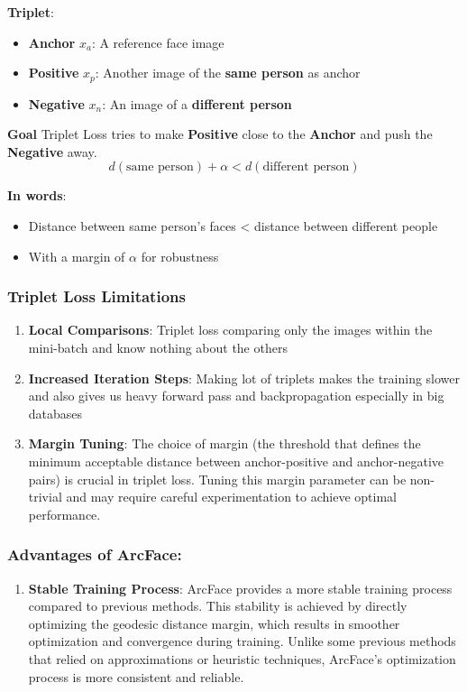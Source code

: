 \documentclass[sommairechap,stylejchiquet]{these_gi}
\begin{document}
\textbf{Triplet}:
\begin{itemize}
    \item \textbf{Anchor} $x_a$: A reference face image
    \item \textbf{Positive} $x_p$: Another image of the \textbf{same person} as anchor
    \item \textbf{Negative} $x_n$: An image of a \textbf{different person}
\end{itemize}

\textbf{Goal}
Triplet Loss tries to make \textbf{Positive} close to the \textbf{Anchor} and push the \textbf{Negative} away.
\begin{equation}
d(\text{same person}) + \alpha < d(\text{different person})
\end{equation}

\textbf{In words}:
\begin{itemize}
    \item Distance between same person's faces < distance between different people
    \item With a margin of $\alpha$ for robustness
\end{itemize}

\subsubsection{Triplet Loss Limitations}
\begin{enumerate}
    \item \textbf{Local Comparisons}: Triplet loss comparing only the images within the mini-batch and know nothing about the others
    \item \textbf{Increased Iteration Steps}: Making lot of triplets makes the training slower and also gives us heavy forward pass and backpropagation especially in big databases
    \item \textbf{Margin Tuning}: The choice of margin (the threshold that defines the minimum acceptable distance between anchor-positive and anchor-negative pairs) is crucial in triplet loss. Tuning this margin parameter can be non-trivial and may require careful experimentation to achieve optimal performance.
\end{enumerate}

\subsubsection{Advantages of ArcFace:}
\begin{enumerate}
    \item \textbf{Stable Training Process}: ArcFace provides a more stable training process compared to previous methods. This stability is achieved by directly optimizing the geodesic distance margin, which results in smoother optimization and convergence during training. Unlike some previous methods that relied on approximations or heuristic techniques, ArcFace's optimization process is more consistent and reliable.
\end{enumerate}
\end{document}
